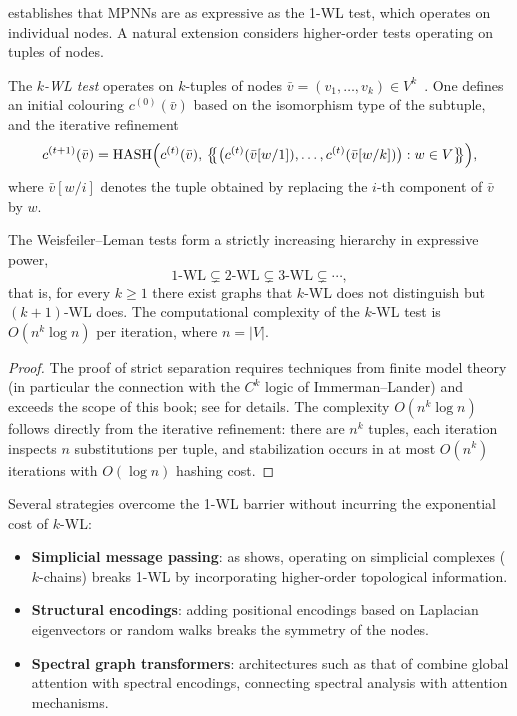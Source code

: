  establishes that MPNNs are as expressive as the 1-WL
test, which operates on individual nodes. A natural extension considers
higher-order tests operating on tuples of nodes.

\begin{definition}
\label{def:priors:kwl}
The \emph{$k$-WL test} operates on $k$-tuples of nodes
$\bar v = (v_1, \dots, v_k) \in V^k$~\citep{morris2019weisfeiler}. One defines an
initial colouring $c^{(0)}(\bar v)$ based on the isomorphism type of the
subtuple, and the iterative refinement
\[
  c^{(t+1)}(\bar v) = \operatorname{HASH}\Bigl(c^{(t)}(\bar v),\,
    \bigl\{\!\!\bigl\{ \bigl(c^{(t)}(\bar v[w/1]), \dots,
      c^{(t)}(\bar v[w/k])\bigr) : w \in V \bigr\}\!\!\bigr\}\Bigr),
\]
where $\bar v[w/i]$ denotes the tuple obtained by replacing the $i$-th component
of $\bar v$ by $w$.
\end{definition}

\begin{proposition}
\label{prop:priors:kwl-hierarchy}
The Weisfeiler--Leman tests form a strictly increasing hierarchy in expressive
power,
\[
  1\text{-WL} \subsetneq 2\text{-WL} \subsetneq 3\text{-WL} \subsetneq \cdots,
\]
that is, for every $k \ge 1$ there exist graphs that $k$-WL does not distinguish
but $(k+1)$-WL does. The computational complexity of the $k$-WL test is
$O(n^k \log n)$ per iteration, where $n = |V|$.
\end{proposition}

\begin{proof}
The proof of strict separation requires techniques from finite model theory (in
particular the connection with the $C^k$ logic of Immerman--Lander) and exceeds
the scope of this book; see \citet{morris2019weisfeiler} for details. The
complexity $O(n^k \log n)$ follows directly from the iterative refinement: there
are $n^k$ tuples, each iteration inspects $n$ substitutions per tuple, and
stabilization occurs in at most $O(n^k)$ iterations with $O(\log n)$ hashing
cost. \qedhere
\end{proof}

Several strategies overcome the 1-WL barrier without incurring the exponential
cost of $k$-WL:
\begin{itemize}
\item \textbf{Simplicial message passing}: as
 shows, operating on simplicial
complexes ($k$-chains) breaks 1-WL by incorporating higher-order topological
information.
\item \textbf{Structural encodings}: adding positional encodings based on
Laplacian eigenvectors or random walks breaks the symmetry of the nodes.
\item \textbf{Spectral graph transformers}: architectures such as that of
\citet{kreuzer2021spectral} combine global attention with spectral encodings,
connecting spectral analysis with attention mechanisms.
\end{itemize}

